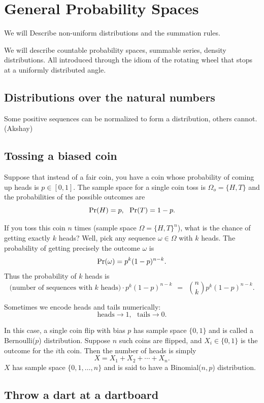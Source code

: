 \chapter{General Probability Spaces}

We will Describe non-uniform distributions and the summation rules.

We will describe countable probability spaces, summable series,
density distributions. All introduced through the idiom of the
rotating wheel that stops at a uniformly distributed angle.

\section{Distributions over the natural numbers}

Some positive sequences can be normalized to form a distribution,
others cannot. (Akshay)

\section{Tossing a biased coin}
\label{sec:BaisedCoin}

Suppose that instead of a fair coin, you have a coin whose probability of coming up heads is $p \in [0,1]$. The sample space for a single coin toss is $\Omega_o = \{H,T\}$ and the probabilities of the possible outcomes are
$$ \mbox{\rm Pr}(H) = p, \ \ \mbox{\rm Pr}(T) = 1-p.$$

If you toss this coin $n$ times (sample space $\Omega = \{H,T\}^n$), what is the chance of getting exactly $k$ heads? Well, pick any sequence $\omega \in \Omega$ with $k$ heads. The probability of getting precisely the outcome $\omega$ is
$$ \mbox{\rm Pr}(\omega) = p^k (1-p)^{n-k} .$$
Thus the probability of $k$ heads is
$$ \mbox{(number of sequences with $k$ heads)} \cdot p^k (1-p)^{n-k} 
\ \ = \ \ 
{n \choose k} p^k (1-p)^{n-k} .$$

Sometimes we encode heads and tails numerically:
$$ \mbox{heads} \rightarrow 1, \ \ \ \mbox{tails} \rightarrow 0 .$$

In this case, a single coin flip with bias $p$ has sample space $\{0,1\}$ and is called a Bernoulli($p$) distribution. Suppose $n$ such coins are flipped, and $X_i \in \{0,1\}$ is the outcome for the $i$th coin. Then the number of heads is simply 
$$ X = X_1 + X_2 + \cdots + X_n. $$
$X$ has sample space $\{0,1,\ldots,n\}$ and is said to have a Binomial($n,p$) distribution.


\section{Throw a dart at a dartboard} 

